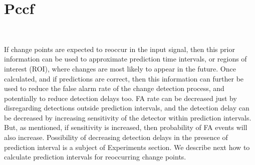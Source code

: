 \section{Pccf}~\label{sec:pccf}

If change points are expected to reoccur in the input signal, then this prior information can be used to approximate prediction time intervals, or regions of interest (ROI), where changes are most likely to appear in the future.
Once calculated, and if predictions are correct, then this information can further be used to reduce the false alarm rate of the change detection process, %
and potentially to reduce detection delays too.
FA rate can be decreased just by disregarding detections outside prediction intervals, and the detection delay can be decreased by increasing sensitivity of the detector within prediction intervals.
But, as mentioned, if sensitivity is increased, then probability of FA events will also  increase.
Possibility of decreasing detection delays in the presence of prediction interval is a subject of Experiments section.
We describe next how to calculate prediction intervals for reoccurring change points.

